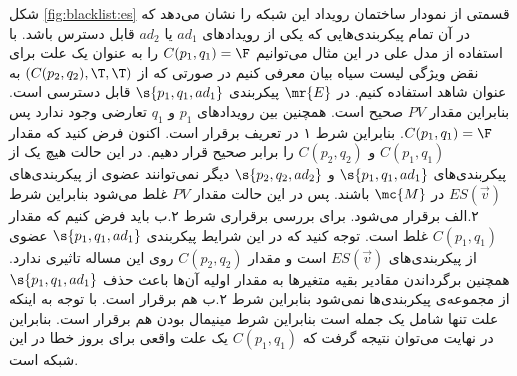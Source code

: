 شکل
\ref{fig:blacklist:es}
قسمتی از نمودار ساختمان رویداد این شبکه را نشان می‌دهد که در آن تمام پیکر‌بندی‌هایی که یکی از رویداد‌های 
$ad_1$
یا
$ad_2$
قابل دسترس باشد.
با استفاده از مدل علی در این مثال می‌توانیم
$C(p_1,q_1) = \F$
را به عنوان یک علت برای نقض ویژگی لیست سیاه بیان معرفی کنیم در صورتی که از
$(C(p_2,q_2),\T,\T)$
به عنوان شاهد استفاده کنیم.
در 
$\mr{E}$
پیکربندی 
$\s{p_1,q_1,ad_1}$
قابل دسترسی است.
بنابراین مقدار
$PV$
صحیح است.
همچنین بین رویداد‌های 
$p_1$
و
$q_1$
تعارضی وجود ندارد پس 
$C(p_1,q_1) = \F$.
بنابراین شرط ۱ در تعریف 
برقرار است.
اکنون فرض کنید که مقدار
$C(p_1,q_1)$
و
$C(p_2,q_2)$
را برابر صحیح قرار دهیم.
در این حالت هیچ یک از پیکر‌بندی‌های 
$\s{p_1,q_1,ad_1}$
و
$\s{p_2,q_2,ad_2}$
دیگر نمی‌توانند عضوی از پیکربندی‌های 
$ES(\vec v)$
در 
$\mc{M}$
باشند.
پس در این حالت مقدار
$PV$
غلط می‌شود بنابراین شرط 
۲.الف برقرار می‌شود.
برای بررسی برقراری شرط ۲.ب
باید فرض کنیم که مقدار
$C(p_1,q_1)$
غلط است.
توجه کنید که در این شرایط پیکربندی
$\s{p_1,q_1,ad_1}$
عضوی از پیکربندی‌های 
$ES(\vec v)$
است و مقدار
$C(p_2,q_2)$
روی این مساله تاثیری ندارد.
همچنین برگرداندن مقادیر بقیه متغیر‌ها به مقدار اولیه آن‌ها باعث حذف 
$\s{p_1,q_1,ad_1}$
از مجموعه‌ی پیکربندی‌ها نمی‌شود بنابراین شرط ۲.ب هم برقرار است.
با توجه به اینکه علت تنها شامل یک جمله است بنابراین شرط مینیمال بودن هم برقرار است.
بنابراین در نهایت می‌توان نتیجه گرفت که 
$C(p_1,q_1)$
یک علت واقعی برای بروز خطا در این شبکه است.

